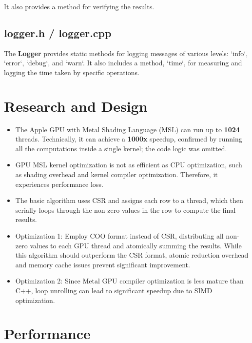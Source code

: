 \documentclass[12pt]{article}
\begin{document}
It also provides a method for verifying the results.

\subsection{logger.h / logger.cpp}
The \textbf{Logger} provides static methods for logging messages of various levels: `info`, `error`, `debug`, and `warn`. It also includes a method, `time`, for measuring and logging the time taken by specific operations.

\section{Research and Design}
\begin{itemize}
    \item The Apple GPU with Metal Shading Language (MSL) can run up to \textbf{1024} threads. Technically, it can achieve a \textbf{1000x} speedup, confirmed by running all the computations inside a single kernel; the code logic was omitted.
    \item GPU MSL kernel optimization is not as efficient as CPU optimization, such as shading overhead and kernel compiler optimization. Therefore, it experiences performance loss.
    \item The basic algorithm uses CSR and assigns each row to a thread, which then serially loops through the non-zero values in the row to compute the final results.
    \item Optimization 1: Employ COO format instead of CSR, distributing all non-zero values to each GPU thread and atomically summing the results. While this algorithm should outperform the CSR format, atomic reduction overhead and memory cache issues prevent significant improvement.
    \item Optimization 2: Since Metal GPU compiler optimization is less mature than C++, loop unrolling can lead to significant speedup due to SIMD optimization.
\end{itemize}

\section{Performance}
\end{document}

